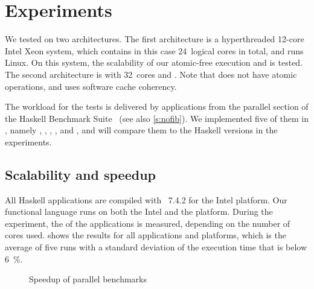 

\section{Experiments}
\label{s:concurrency:experiments}

We tested \ourfp* on two architectures.
The first architecture is a hyperthreaded 12-core Intel Xeon system, which contains in this case 24~logical cores in total, and runs Linux.
On this system, the scalability of our atomic-free execution and  is tested.
The second architecture is \Starburst* with 32~cores and \Warpfield.
Note that \Starburst does not have atomic  operations, and uses software cache coherency.

The workload for the tests is delivered by applications from the parallel section of the Haskell \NoFib* Benchmark Suite~\cite{nofib} (see also \cref{s:nofib}).
We implemented five of them in \ourfp, namely , , , , and , and will compare them to the Haskell versions in the experiments.

\subsection{Scalability and speedup}

All Haskell applications are compiled with ~7.4.2 for the Intel platform.
Our functional language runs on both the Intel and the \Starburst platform.
During the experiment, the  of the applications is measured, depending on the number of cores used.
 shows the results for all applications and platforms, which is the average of five runs with a standard deviation of the execution time that is below \SI{6}{\percent}.

\begin{figure}%
%
\caption{Speedup of \NoFib parallel benchmarks}%
\label{fig:concurrency:speedup}%
\end{figure}


